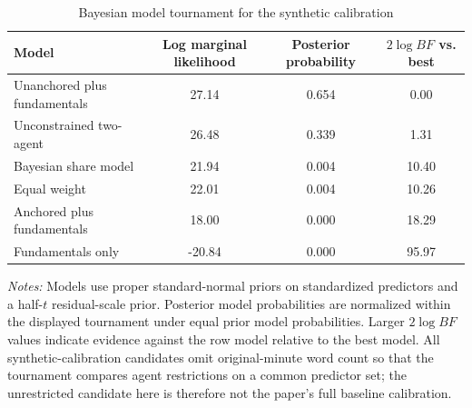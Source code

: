 \begin{table}[htbp]
\color{revisionred}
\centering
\begin{threeparttable}
\caption{Bayesian model tournament for the synthetic calibration}
\label{tab:tournament-calibration}
\begin{scriptsize}
\setlength{\tabcolsep}{4.2pt}
\begin{tabular}{lccc}
\toprule
Model & Log marginal likelihood & Posterior probability & $2\log BF$ vs. best \\
\midrule
Unanchored plus fundamentals & 27.14 & 0.654 & 0.00 \\
Unconstrained two-agent & 26.48 & 0.339 & 1.31 \\
Bayesian share model & 21.94 & 0.004 & 10.40 \\
Equal weight & 22.01 & 0.004 & 10.26 \\
Anchored plus fundamentals & 18.00 & 0.000 & 18.29 \\
Fundamentals only & -20.84 & 0.000 & 95.97 \\
\bottomrule
\end{tabular}
\begin{tablenotes}[flushleft]
\scriptsize
\item \textit{Notes:} Models use proper standard-normal priors on standardized predictors and a half-$t$ residual-scale prior. Posterior model probabilities are normalized within the displayed tournament under equal prior model probabilities. Larger $2\log BF$ values indicate evidence against the row model relative to the best model. All synthetic-calibration candidates omit original-minute word count so that the tournament compares agent restrictions on a common predictor set; the unrestricted candidate here is therefore not the paper's full baseline calibration.
\end{tablenotes}
\end{scriptsize}
\end{threeparttable}
\end{table}
